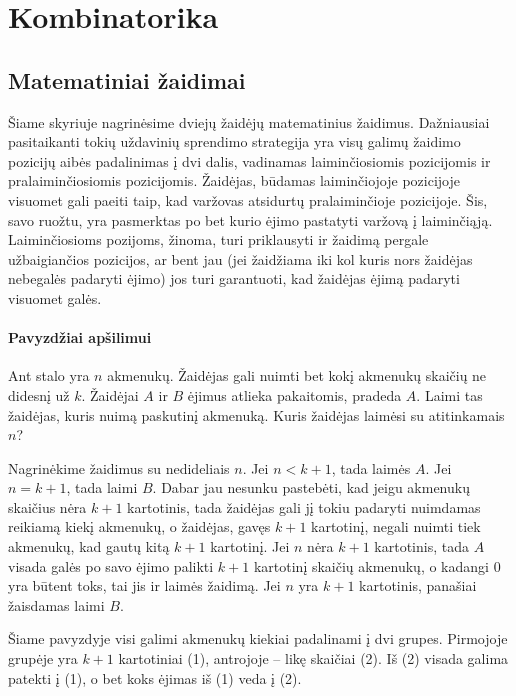 \chapter{Kombinatorika}
\thispagestyle{empty}

\section{Matematiniai žaidimai}

Šiame skyriuje nagrinėsime dviejų žaidėjų matematinius žaidimus.
Dažniausiai pasitaikanti tokių uždavinių sprendimo strategija yra visų
galimų žaidimo pozicijų aibės padalinimas į dvi dalis, vadinamas laiminčiosiomis
pozicijomis ir pralaiminčiosiomis pozicijomis. Žaidėjas, būdamas
laiminčiojoje pozicijoje visuomet gali paeiti taip, kad varžovas atsidurtų
pralaiminčioje pozicijoje. Šis, savo ruožtu, yra pasmerktas po bet kurio
ėjimo pastatyti varžovą į laiminčiąją. Laiminčiosioms pozijoms, žinoma,
turi priklausyti ir žaidimą pergale užbaigiančios pozicijos, ar bent jau (jei
žaidžiama iki kol kuris nors žaidėjas nebegalės padaryti ėjimo) jos turi
garantuoti, kad žaidėjas ėjimą padaryti visuomet galės. 


\subsubsection{Pavyzdžiai apšilimui}

\begin{pavnr}
  Ant stalo yra $n$ akmenukų. Žaidėjas gali nuimti bet kokį akmenukų skaičių
  ne didesnį už $k$. Žaidėjai $A$ ir $B$ ėjimus atlieka pakaitomis, pradeda $A$.
  Laimi tas žaidėjas, kuris nuimą paskutinį akmenuką. Kuris žaidėjas laimėsi
  su atitinkamais $n$?
\end{pavnr}

Nagrinėkime žaidimus su nedideliais $n$. Jei  $n<k+1$, tada laimės $A$. Jei $n =
k+1$, tada laimi $B$. Dabar jau nesunku pastebėti, kad jeigu akmenukų skaičius
nėra $k+1$ kartotinis, tada žaidėjas gali jį tokiu padaryti nuimdamas
reikiamą kiekį akmenukų, o žaidėjas, gavęs  $k+1$ kartotinį, negali nuimti
tiek akmenukų, kad gautų kitą $k+1$ kartotinį. Jei $n$ nėra $k+1$
kartotinis, tada $A$ visada galės po savo ėjimo palikti $k+1$ kartotinį
skaičių akmenukų, o kadangi $0$ yra būtent toks, tai jis ir laimės žaidimą.
Jei $n$ yra $k+1$ kartotinis, panašiai žaisdamas laimi $B$. 

\begin{pastaba}Šiame pavyzdyje visi galimi akmenukų kiekiai padalinami į
  dvi grupes. Pirmojoje grupėje yra $k+1$ kartotiniai (1), antrojoje – likę
  skaičiai (2). Iš (2) visada galima patekti į (1), o bet koks ėjimas iš
  (1) veda į (2). 
\end{pastaba}

